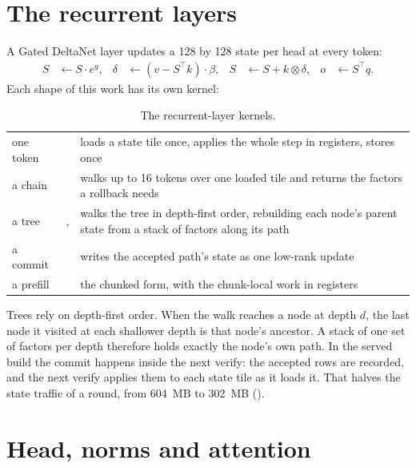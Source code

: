 \section{The recurrent layers}

A Gated DeltaNet layer updates a 128 by 128 state per head at every token:
\begin{align*}
S &\leftarrow S \cdot e^{g}, &
\delta &\leftarrow (v - S^\top k)\cdot\beta, &
S &\leftarrow S + k \otimes \delta, &
o &\leftarrow S^\top q.
\end{align*}
Each shape of this work has its own kernel:

\begin{table}[htbp]
\centering\small
\caption{The recurrent-layer kernels.}\label{tab:gdn-kernels}
\begin{tabularx}{\linewidth}{@{}L{.14\linewidth}L{.32\linewidth}Y@{}}
\toprule
{} &  &  \\
\midrule
one token &  & loads a state tile once, applies the whole step in registers, stores once \\
a chain &  & walks up to 16 tokens over one loaded tile and returns the factors a rollback needs \\
a tree & ,  & walks the tree in depth-first order, rebuilding each node's parent state from a stack of factors along its path \\
a commit &  & writes the accepted path's state as one low-rank update \\
a prefill &  & the chunked form, with the chunk-local work in registers \\
\bottomrule
\end{tabularx}
\end{table}

Trees rely on depth-first order. When the walk reaches a node at depth $d$, the last node it visited at each shallower depth is that node's ancestor. A stack of one set of factors per depth therefore holds exactly the node's own path. In the served build the commit happens inside the next verify: the accepted rows are recorded, and the next verify applies them to each state tile as it loads it. That halves the state traffic of a round, from 604~MB to 302~MB (\arith).

\section{Head, norms and attention}

